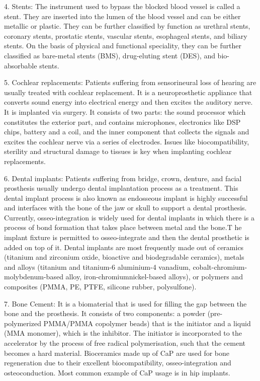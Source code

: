 \documentclass[11pt]{article}
\begin{document}
4. Stents: The instrument used to bypass the blocked blood vessel is called a stent. They are inserted into the lumen of the blood vessel and can be either metallic or plastic. They can be further classified by function as urethral stents, coronary stents, prostatic stents, vascular stents, esophageal stents, and biliary stents. On the basis of physical and functional speciality, they can be further classified as bare-metal stents (BMS), drug-eluting stent (DES), and bio-absorbable stents.

5. Cochlear replacements: Patients suffering from sensorineural loss of hearing are usually treated with cochlear replacement. It is a  neuroprosthetic appliance that converts sound energy into electrical energy and then excites the auditory nerve. It is implanted via surgery. It consists of two parts: the sound processor which constitutes the exterior part, and contains microphones, electronics like DSP chips, battery and a coil, and the inner component that collects the signals and excites the cochlear nerve via a series of electrodes. Issues like biocompatibility, sterility and structural damage to tissues is key when implanting cochlear replacements.

6. Dental implants: Patients suffering from  bridge, crown, denture, and facial prosthesis usually undergo dental implantation process as a treatment. This dental implant process is also known as endosseous implant is highly successful and interfaces with the bone of the jaw or skull to support a dental prosthesis. Currently, osseo-integration is widely used for dental implants in which there is a process of bond formation that takes place between metal and the bone.T he implant fixture is permitted to osseo-integrate and then the dental prosthetic is added on top of it. Dental implants are most frequently made out of ceramics (titanium and zirconium oxide, bioactive and
biodegradable ceramics), metals and alloys (titanium and titanium-6 aluminium-4 vanadium, cobalt-chromium-molybdenum-based alloy, iron-chromiumnickel-based alloys), or polymers and composites (PMMA, PE, PTFE, silicone rubber, polysulfone).  

7. Bone Cement: It is a biomaterial that is used for filling the gap between the bone and the prosthesis. It consists of two components: a powder (pre-polymerized PMMA/PMMA copolymer beads) that is the initiator and a liquid (MMA monomer), which is the inhibitor. The initiator is incorporated to the accelerator by the process of free radical polymerisation, such that the cement becomes a hard material. Bioceramics made up of CaP are used for bone regeneration due to their excellent biocompatibility, osseo-integration and osteoconduction. Most common example of CaP usage is in hip implants.
\end{document}
